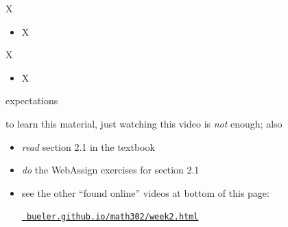 \documentclass{beamer}
\begin{document}
\begin{frame}{X}

\begin{itemize}
\item X
\end{itemize}
\end{frame}


\begin{frame}{X}

\begin{itemize}
\item X
\end{itemize}
\end{frame}




\begin{frame}{expectations}

to learn this material, just watching this video is \emph{not} enough; also
\begin{itemize}
\item \emph{read} section 2.1 in the textbook
\item \emph{do} the WebAssign exercises for section 2.1
\item see the other ``found online'' videos at bottom of this page:

\centerline{\href{https://bueler.github.io/math302/week2.html}{\tt \color{cyan} bueler.github.io/math302/week2.html}}
\end{itemize}
\end{frame}
\end{document}
